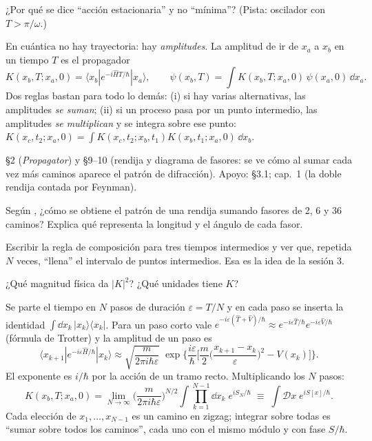 ¿Por qué se dice ``acción estacionaria'' y no ``mínima''? (Pista: oscilador con $T>\pi/\omega$.)


En cuántica no hay trayectoria: hay \emph{amplitudes}. La amplitud de ir de $x_a$ a $x_b$ en un tiempo $T$ es el propagador
\[
K(x_b,T;x_a,0)=\langle x_b|e^{-i\hat HT/\hbar}|x_a\rangle,\qquad
\psi(x_b,T)=\int K(x_b,T;x_a,0)\,\psi(x_a,0)\,\dd x_a .
\]
Dos reglas bastan para todo lo demás: (i) si hay varias alternativas, las amplitudes \emph{se suman}; (ii) si un proceso pasa por un punto intermedio, las amplitudes \emph{se multiplican} y se integra sobre ese punto:
$K(x_c,t_2;x_a,0)=\int K(x_c,t_2;x_b,t_1)K(x_b,t_1;x_a,0)\,\dd x_b$.

 \S2 (\textit{Propagator}) y \S9--10 (rendija y diagrama de fasores: se ve cómo al sumar cada vez más caminos aparece el patrón de difracción). Apoyo:  \S3.1;  cap.~1 (la doble rendija contada por Feynman).

\begin{prompt}
Según , ¿cómo se obtiene el patrón de una rendija sumando fasores de 2, 6 y 36 caminos? Explica qué representa la longitud y el ángulo de cada fasor.
\end{prompt}

Escribir la regla de composición para tres tiempos intermedios y ver que, repetida $N$ veces, ``llena'' el intervalo de puntos intermedios. Esa es la idea de la sesión 3.

¿Qué magnitud física da $|K|^2$? ¿Qué unidades tiene $K$?


Se parte el tiempo en $N$ pasos de duración $\varepsilon=T/N$ y en cada paso se inserta la identidad $\int\dd x_k\,|x_k\rangle\langle x_k|$. Para un paso corto vale $e^{-i\varepsilon(\hat T+\hat V)/\hbar}\approx e^{-i\varepsilon\hat T/\hbar}e^{-i\varepsilon\hat V/\hbar}$ (fórmula de Trotter) y la amplitud de un paso es
\[
\langle x_{k+1}|e^{-i\varepsilon\hat H/\hbar}|x_k\rangle\approx\sqrt{\frac{m}{2\pi i\hbar\varepsilon}}\;
\exp\!\Big\{\frac{i\varepsilon}{\hbar}\Big[\frac m2\Big(\frac{x_{k+1}-x_k}{\varepsilon}\Big)^2-V(x_k)\Big]\Big\}.
\]
El exponente es $i/\hbar$ por la acción de un tramo recto. Multiplicando los $N$ pasos:
\[
K(x_b,T;x_a,0)=\lim_{N\to\infty}\Big(\frac{m}{2\pi i\hbar\varepsilon}\Big)^{N/2}\int\prod_{k=1}^{N-1}\dd x_k\;e^{iS_N/\hbar}\;\equiv\;\int\mathcal Dx\;e^{iS[x]/\hbar}.
\]
Cada elección de $x_1,\dots,x_{N-1}$ es un camino en zigzag; integrar sobre todas es ``sumar sobre todos los caminos'', cada uno con el mismo módulo y con fase $S/\hbar$.

